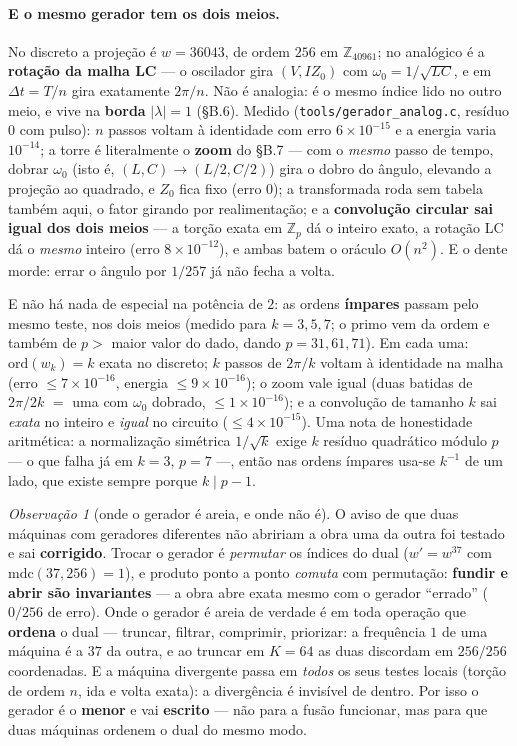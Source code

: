 \documentclass[11pt]{article}
\newcommand{\code}[1]{\texttt{\small #1}}
\theoremstyle{plain}
\theoremstyle{remark}
\newtheorem{observacao}[teorema]{Observação}
\begin{document}
\paragraph{E o mesmo gerador tem os dois meios.} No discreto a projeção é $w=36043$, de ordem $256$ em
$\mathbb{Z}_{40961}$; no analógico é a \textbf{rotação da malha LC} --- o oscilador gira $(V,I Z_0)$
com $\omega_0=1/\sqrt{LC}$, e em $\Delta t=T/n$ gira exatamente $2\pi/n$. Não é analogia: é o mesmo
índice lido no outro meio, e vive na \textbf{borda} $|\lambda|=1$ (§B.6). Medido
(\code{tools/gerador\_analog.c}, resíduo $0$ com pulso): $n$ passos voltam à identidade com erro
$6\times10^{-15}$ e a energia varia $10^{-14}$; a torre é literalmente o \textbf{zoom} do §B.7 --- com
o \emph{mesmo} passo de tempo, dobrar $\omega_0$ (isto é, $(L,C)\to(L/2,C/2)$) gira o dobro do ângulo,
elevando a projeção ao quadrado, e $Z_0$ fica fixo (erro $0$); a transformada roda sem tabela também
aqui, o fator girando por realimentação; e a \textbf{convolução circular sai igual dos dois meios} ---
a torção exata em $\mathbb Z_p$ dá o inteiro exato, a rotação LC dá o \emph{mesmo} inteiro (erro
$8\times10^{-12}$), e ambas batem o oráculo $O(n^2)$. E o dente morde: errar o ângulo por $1/257$ já
não fecha a volta.

E não há nada de especial na potência de $2$: as ordens \textbf{ímpares} passam pelo mesmo teste, nos
dois meios (medido para $k=3,5,7$; o primo vem da ordem e também de $p>$ maior valor do dado, dando
$p=31,61,71$). Em cada uma: $\mathrm{ord}(w_k)=k$ exata no discreto; $k$ passos de $2\pi/k$ voltam à
identidade na malha (erro $\le7\times10^{-16}$, energia $\le9\times10^{-16}$); o zoom vale igual (duas
batidas de $2\pi/2k$ $=$ uma com $\omega_0$ dobrado, $\le1\times10^{-16}$); e a convolução de tamanho
$k$ sai \emph{exata} no inteiro e \emph{igual} no circuito ($\le4\times10^{-15}$). Uma nota de honestidade
aritmética: a normalização simétrica $1/\sqrt k$ exige $k$ resíduo quadrático módulo $p$ --- o que falha
já em $k=3$, $p=7$ ---, então nas ordens ímpares usa-se $k^{-1}$ de um lado, que existe sempre porque
$k\mid p-1$.

\begin{observacao}[onde o gerador é areia, e onde não é]
O aviso de que duas máquinas com geradores diferentes não abririam a obra uma da outra foi testado e
sai \textbf{corrigido}. Trocar o gerador é \emph{permutar} os índices do dual ($w'=w^{37}$ com
$\mathrm{mdc}(37,256)=1$), e produto ponto a ponto \emph{comuta} com permutação: \textbf{fundir e abrir
são invariantes} --- a obra abre exata mesmo com o gerador ``errado'' ($0/256$ de erro). Onde o gerador
é areia de verdade é em toda operação que \textbf{ordena} o dual --- truncar, filtrar, comprimir,
priorizar: a frequência $1$ de uma máquina é a $37$ da outra, e ao truncar em $K=64$ as duas discordam
em $256/256$ coordenadas. E a máquina divergente passa em \emph{todos} os seus testes locais (torção de
ordem $n$, ida e volta exata): a divergência é invisível de dentro. Por isso o gerador é o \textbf{menor}
e vai \textbf{escrito} --- não para a fusão funcionar, mas para que duas máquinas ordenem o dual do
mesmo modo.
\end{observacao}
\end{document}
